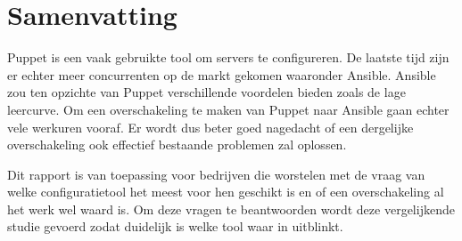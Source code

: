 





\chapter*{Samenvatting}
Puppet is een vaak gebruikte tool om servers te configureren. De laatste tijd zijn er echter meer concurrenten op de markt gekomen waaronder Ansible. Ansible zou ten opzichte van Puppet verschillende voordelen bieden zoals de lage leercurve. Om een overschakeling te maken van Puppet naar Ansible gaan echter vele werkuren vooraf. Er wordt dus beter goed nagedacht of een dergelijke overschakeling ook effectief bestaande problemen zal oplossen.


Dit rapport is van toepassing voor bedrijven die worstelen met de vraag van welke configuratietool het meest voor hen geschikt is en of een overschakeling al het werk wel waard is. Om deze vragen te beantwoorden wordt deze vergelijkende studie gevoerd zodat duidelijk is welke tool waar in uitblinkt.

